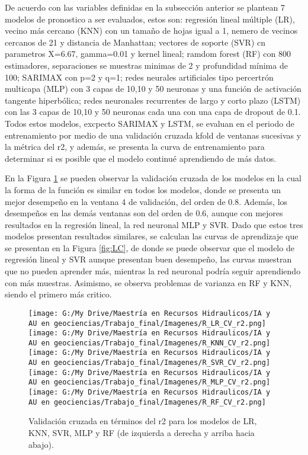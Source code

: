 \documentclass[draft]{agujournal2019}
\begin{document}
De acuerdo con las variables definidas en la subsección anterior se plantean 7 modelos de pronostico a ser evaluados, estos son: regresión lineal múltiple (LR), vecino más cercano (KNN) con un tamaño de hojas igual a 1, nemero de vecinos cercanos de 21 y distancia de Manhattan; vectores de soporte (SVR) cn parametros X=6.67, gamma=0.01 y kernel lineal; ramdom forest (RF) con 800 estimadores, separaciones se muestras minimas de 2 y profundidad mínima de 100; SARIMAX con p=2 y q=1;  redes neurales artificiales tipo percertrón multicapa (MLP) con 3 capas de 10,10 y 50 neuronas y una función de activación tangente hiperbólica; redes neuronales recurrentes de largo y corto plazo (LSTM) con las 3 capas de 10,10 y 50 neuronas cada una con una capa de dropout de 0.1. Todos estos modelos, excpecto SARIMAX y LSTM, se evaluan en el periodo de entrenamiento por medio de una validación cruzada kfold de ventanas sucesivas y la métrica del r2, y además, se presenta la curva de entrenamiento para determinar si es posible que el modelo continué aprendiendo de más datos. 

En la Figura \ref{fig:kfold} se pueden observar la validación cruzada de los modelos en la cual la forma de la función es similar en todos los modelos, donde se presenta un mejor desempeño en la ventana 4 de validación, del orden de 0.8. Además, los desempeños en las demás ventanas son del orden de 0.6, aunque con mejores resultados en la regresión lineal, la red neuronal MLP y SVR. Dado que estos tres modelos presentan resultados similares, se calculan las curvas de aprendizaje que se presentan en la Figura \ref{fig:LC}, de donde se puede observar que el modelo de regresión lineal y SVR aunque presentan buen desempeño, las curvas muestran que no pueden aprender más, mientras la red neuronal podría seguir aprendiendo con más muestras. Asimismo, se observa problemas de varianza en RF y KNN, siendo el primero más critico.

\begin{figure}[!]
	\centering%
	\texttt{[image: G:/My Drive/Maestría en Recursos Hidraulicos/IA y AU en geociencias/Trabajo\_final/Imagenes/R\_LR\_CV\_r2.png]}
	\texttt{[image: G:/My Drive/Maestría en Recursos Hidraulicos/IA y AU en geociencias/Trabajo\_final/Imagenes/R\_KNN\_CV\_r2.png]}
	\texttt{[image: G:/My Drive/Maestría en Recursos Hidraulicos/IA y AU en geociencias/Trabajo\_final/Imagenes/R\_SVR\_CV\_r2.png]}\\
	\texttt{[image: G:/My Drive/Maestría en Recursos Hidraulicos/IA y AU en geociencias/Trabajo\_final/Imagenes/R\_MLP\_CV\_r2.png]}
	\texttt{[image: G:/My Drive/Maestría en Recursos Hidraulicos/IA y AU en geociencias/Trabajo\_final/Imagenes/R\_RF\_CV\_r2.png]}
	\caption{Validación cruzada en términos del r2 para los modelos de LR, KNN, SVR, MLP y RF (de izquierda a derecha y arriba hacia abajo).} \label{fig:kfold}
\end{figure}
\end{document}

